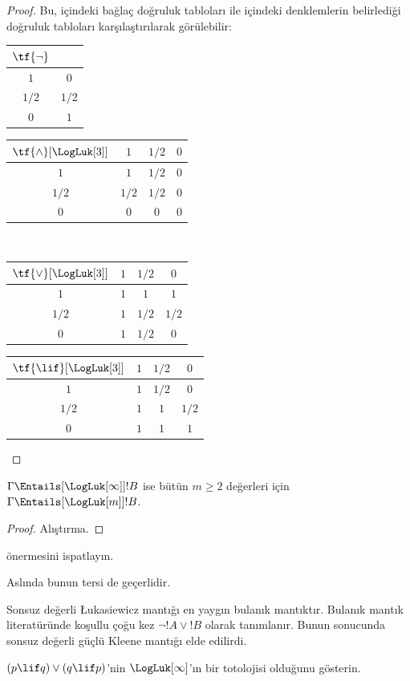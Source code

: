 \documentclass[../../../include/open-logic-section]{subfiles}
\begin{document}
\begin{proof}
  Bu,  içindeki bağlaç doğruluk tabloları
  ile  içindeki denklemlerin belirlediği doğruluk
  tabloları karşılaştırılarak görülebilir:
  \begin{center}
    \begin{tabular}{c|c} 
      $\tf{\lnot}$ & \\ 
      \hline  
      $1$ & $0$ \\ 
      $1/2$ & $1/2$ \\
      $0$ & $1$ 
    \end{tabular}
    \quad
    \begin{tabular}{c|ccc} 
      $\tf{\land}[\LogLuk[3]]$ & $1$ & $1/2$ & $0$ \\ 
      \hline 
      $1$ & $1$ & $1/2$ & $0$ \\ 
      $1/2$ & $1/2$ & $1/2$ & $0$\\ 
      $0$ & $0$ & $0$ & $0$ 
    \end{tabular}
    \\[2ex]
    \begin{tabular}{c|ccc} 
      $\tf{\lor}[\LogLuk[3]]$ & $1$ & $1/2$ & $0$ \\ 
      \hline 
      $1$ & $1$ & $1$ & $1$ \\ 
      $1/2$ & $1$ & $1/2$ & $1/2$ \\
      $0$ & $1$ & $1/2$ & $0$ 
    \end{tabular}
    \quad
    \begin{tabular}{c|ccc} 
      $\tf{\lif}[\LogLuk[3]]$ & $1$ & $1/2$ & $0$ \\ 
      \hline 
      $1$ & $1$ & $1/2$ & $0$ \\ 
      $1/2$ & $1$ & $1$ & $1/2$  \\ 
      $0$ & $1$ & $1$ & $1$ 
    \end{tabular}
  \end{center} 
\end{proof}

\begin{prop}
  $\Gamma \Entails[\LogLuk[\infty]] !B$ ise bütün $m \ge 2$ değerleri için
  $\Gamma \Entails[\LogLuk[m]] !B$.
\end{prop}

\begin{proof}
  Alıştırma.
\end{proof}

\begin{prob}
   önermesini ispatlayın.
\end{prob}

Aslında bunun tersi de geçerlidir.

Sonsuz değerli \L ukasiewicz mantığı en yaygın bulanık mantıktır. Bulanık
mantık literatüründe koşullu çoğu kez $\lnot !A \lor !B$ olarak tanımlanır.
Bunun sonucunda sonsuz değerli güçlü Kleene mantığı elde edilirdi.

\begin{prob}
  $(p \lif q) \lor (q \lif p)$'nin $\LogLuk[\infty]$'ın bir totolojisi
  olduğunu gösterin.
\end{prob}
\end{document}

